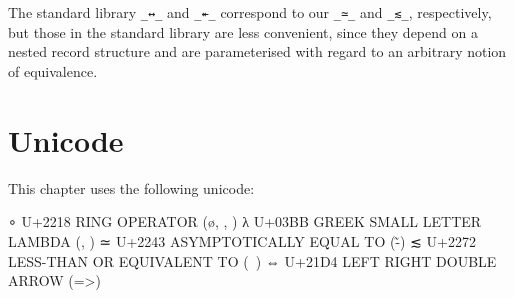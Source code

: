 \begin{fence}
\begin{code}%
\>[0]\AgdaSpace{}%
\AgdaSpace{}%
\AgdaSpace{}%
\AgdaSymbol{(}\AgdaSymbol{)}\<%
\\
\>[0]\AgdaSpace{}%
\AgdaSpace{}%
\AgdaSpace{}%
\AgdaSymbol{(}\AgdaSymbol{)}\<%
\\
\>[0]\AgdaSpace{}%
\AgdaSpace{}%
\AgdaSpace{}%
\AgdaSymbol{(}\AgdaSymbol{)}\<%
\end{code}
\end{fence}

The standard library \texttt{\_↔\_} and \texttt{\_↞\_} correspond to our
\texttt{\_≃\_} and \texttt{\_≲\_}, respectively, but those in the
standard library are less convenient, since they depend on a nested
record structure and are parameterised with regard to an arbitrary
notion of equivalence.

\hypertarget{unicode}{%
\section{Unicode}\label{unicode}}

This chapter uses the following unicode:

\begin{myDisplay}
∘  U+2218  RING OPERATOR (\o, \circ, \comp)
λ  U+03BB  GREEK SMALL LETTER LAMBDA (\lambda, \Gl)
≃  U+2243  ASYMPTOTICALLY EQUAL TO (\~-)
≲  U+2272  LESS-THAN OR EQUIVALENT TO (\<~)
⇔  U+21D4  LEFT RIGHT DOUBLE ARROW (\<=>)
\end{myDisplay}


